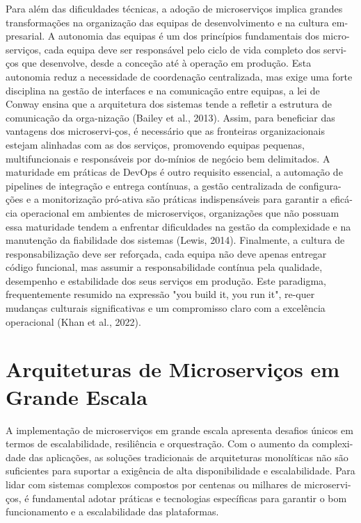 Para além das dificuldades técnicas, a adoção de microserviços implica grandes transformações na organização das equipas de desenvolvimento e na cultura em-presarial. A autonomia das equipas é um dos princípios fundamentais dos micro-serviços, cada equipa deve ser responsável pelo ciclo de vida completo dos servi-ços que desenvolve, desde a conceção até à operação em produção. Esta autonomia reduz a necessidade de coordenação centralizada, mas exige uma forte disciplina na gestão de interfaces e na comunicação entre equipas, a lei de Conway ensina que a arquitetura dos sistemas tende a refletir a estrutura de comunicação da orga-nização (Bailey et al., 2013). Assim, para beneficiar das vantagens dos microservi-ços, é necessário que as fronteiras organizacionais estejam alinhadas com as dos serviços, promovendo equipas pequenas, multifuncionais e responsáveis por do-mínios de negócio bem delimitados.
A maturidade em práticas de DevOps é outro requisito essencial, a automação de pipelines de integração e entrega contínuas, a gestão centralizada de configura-ções e a monitorização pró-ativa são práticas indispensáveis para garantir a eficá-cia operacional em ambientes de microserviços, organizações que não possuam essa maturidade tendem a enfrentar dificuldades na gestão da complexidade e na manutenção da fiabilidade dos sistemas (Lewis, 2014).
Finalmente, a cultura de responsabilização deve ser reforçada, cada equipa não deve apenas entregar código funcional, mas assumir a responsabilidade contínua pela qualidade, desempenho e estabilidade dos seus serviços em produção. Este paradigma, frequentemente resumido na expressão "you build it, you run it", re-quer mudanças culturais significativas e um compromisso claro com a excelência operacional (Khan et al., 2022).

\section{Arquiteturas de Microserviços em Grande Escala}

A implementação de microserviços em grande escala apresenta desafios únicos em termos de escalabilidade, resiliência e orquestração. Com o aumento da complexi-dade das aplicações, as soluções tradicionais de arquiteturas monolíticas não são suficientes para suportar a exigência de alta disponibilidade e escalabilidade. Para lidar com sistemas complexos compostos por centenas ou milhares de microservi-ços, é fundamental adotar práticas e tecnologias específicas para garantir o bom funcionamento e a escalabilidade das plataformas.

